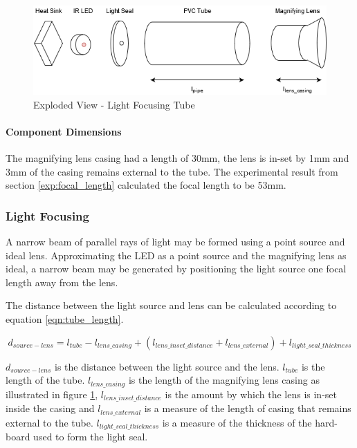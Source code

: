 \begin{figure}[H]
	\centering
	\includegraphics[width=.8\textwidth]{figures/design/beam_tube.png}
	\caption{Exploded View - Light Focusing Tube}
	\label{fig:light_focusing_tube}
\end{figure}

\paragraph{Component Dimensions}
The magnifying lens casing had a length of 30mm, the lens is in-set by 1mm and 3mm of the casing remains external to the tube. The experimental result from section \ref{exp:focal_length} calculated the focal length to be 53mm.

\subsubsection{Light Focusing}

A narrow beam of parallel rays of light may be formed using a point source and ideal lens. Approximating the LED as a point source and the magnifying lens as ideal, a narrow beam may be generated by positioning the light source one focal length away from the lens.

The distance between the light source and lens can be calculated according to equation \ref{eqn:tube_length}.

\begin{equation}
	d_{source-lens} = l_{tube} - l_{lens\_casing} + (l_{lens\_inset\_distance} + l_{lens\_external}) + l_{light\_seal\_thickness}
	\label{eqn:tube_length}
\end{equation}

$d_{source-lens}$ is the distance between the light source and the lens. $l_{tube}$ is the length of the tube. $l_{lens\_casing}$ is the length of the magnifying lens casing as illustrated in figure \ref{fig:light_focusing_tube}, $l_{lens\_inset\_distance}$ is the amount by which the lens is in-set inside the casing and $l_{lens\_external}$ is a measure of the length of casing that remains external to the tube. $l_{light\_seal\_thickness}$ is a measure of the thickness of the hard-board used to form the light seal.

